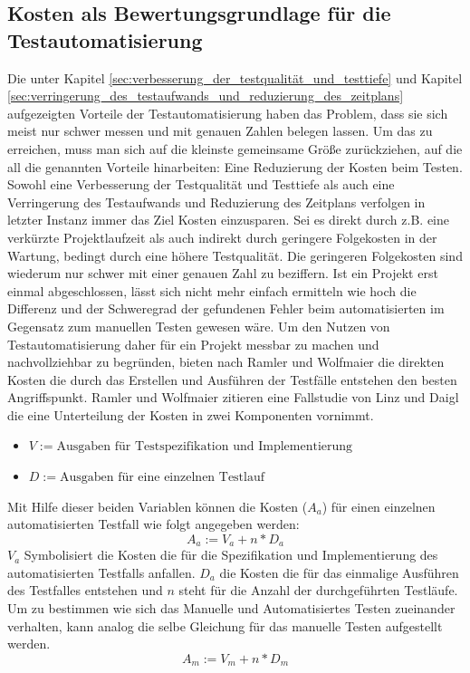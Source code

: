 \subsection{Kosten als Bewertungsgrundlage für die Testautomatisierung}
\label{sec:kosten_der_testautomatisierung}
Die unter Kapitel \ref{sec:verbesserung_der_testqualität_und_testtiefe} und Kapitel \ref{sec:verringerung_des_testaufwands_und_reduzierung_des_zeitplans} aufgezeigten Vorteile der Testautomatisierung haben das Problem, dass sie sich meist nur schwer messen und mit genauen Zahlen belegen lassen.
Um das zu erreichen, muss man sich auf die kleinste gemeinsame Größe zurückziehen, auf die all die genannten Vorteile hinarbeiten: Eine Reduzierung der Kosten beim Testen.
Sowohl eine Verbesserung der Testqualität und Testtiefe als auch eine Verringerung des Testaufwands und Reduzierung des Zeitplans verfolgen in letzter Instanz immer das Ziel Kosten einzusparen. Sei es direkt durch z.B. eine verkürzte Projektlaufzeit als auch indirekt durch geringere Folgekosten in der Wartung, bedingt durch eine höhere Testqualität.
Die geringeren Folgekosten sind wiederum nur schwer mit einer genauen Zahl zu beziffern. Ist ein Projekt erst einmal abgeschlossen, lässt sich nicht mehr einfach ermitteln wie hoch die Differenz und der Schweregrad der gefundenen Fehler beim automatisierten im Gegensatz zum manuellen Testen gewesen wäre.
Um den Nutzen von Testautomatisierung daher für ein Projekt messbar zu machen und nachvollziehbar zu begründen, bieten nach Ramler und Wolfmaier \cite{ramler_economic_2006} die direkten Kosten die durch das Erstellen und Ausführen der Testfälle entstehen den besten Angriffspunkt. 
Ramler und Wolfmaier \cite{ramler_economic_2006} zitieren eine Fallstudie von Linz und Daigl \cite{dustin_automated_1999} die eine Unterteilung der Kosten in zwei Komponenten vornimmt.
\begin{itemize}
    \item[] \(V:=\text{Ausgaben für Testspezifikation und Implementierung}\)
    \item[] \(D:=\text{Ausgaben für eine einzelnen Testlauf}\)
\end{itemize}

Mit Hilfe dieser beiden Variablen können die Kosten (\(A_a\)) für einen einzelnen automatisierten Testfall wie folgt angegeben werden:
\begin{equation}
A_a:=V_a+n*D_a
\end{equation}
\(V_a\) Symbolisiert die Kosten die für die Spezifikation und Implementierung des automatisierten Testfalls anfallen. \(D_a\) die Kosten die für das einmalige Ausführen des Testfalles entstehen und \(n\) steht für die Anzahl der durchgeführten Testläufe.
Um zu bestimmen wie sich das Manuelle und Automatisiertes Testen zueinander verhalten, kann analog die selbe Gleichung für das manuelle Testen aufgestellt werden.
\begin{equation}
A_m:=V_m+n*D_m
\end{equation}

